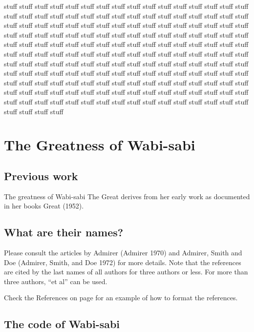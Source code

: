 \documentclass[
  dissertation]{bsu-cs}
\begin{document}
stuff stuff stuff stuff stuff stuff stuff stuff stuff stuff stuff stuff
stuff stuff stuff stuff stuff stuff stuff stuff stuff stuff stuff stuff
stuff stuff stuff stuff stuff stuff stuff stuff stuff stuff stuff stuff
stuff stuff stuff stuff stuff stuff stuff stuff stuff stuff stuff stuff
stuff stuff stuff stuff stuff stuff stuff stuff stuff stuff stuff stuff
stuff stuff stuff stuff stuff stuff stuff stuff stuff stuff stuff stuff
stuff stuff stuff stuff stuff stuff stuff stuff stuff stuff stuff stuff
stuff stuff stuff stuff stuff stuff stuff stuff stuff stuff stuff stuff
stuff stuff stuff stuff stuff stuff stuff stuff stuff stuff stuff stuff
stuff stuff stuff stuff stuff stuff stuff stuff stuff stuff stuff stuff
stuff stuff stuff stuff stuff stuff stuff stuff stuff stuff stuff stuff
stuff stuff stuff stuff stuff stuff stuff stuff stuff stuff stuff stuff
stuff stuff stuff stuff stuff stuff stuff stuff stuff stuff stuff stuff
stuff stuff stuff stuff stuff stuff stuff stuff stuff stuff stuff stuff
stuff stuff stuff stuff stuff stuff stuff stuff stuff stuff stuff stuff

\chapter{The Greatness of Wabi-sabi} \label{ch-wabisabiGreatness}

\section{Previous work}\label{previous-work}

The greatness of Wabi-sabi The Great derives from her early work as
documented in her books Great (1952).

\section{What are their names?}\label{what-are-their-names}

Please consult the articles by Admirer (Admirer 1970) and Admirer, Smith
and Doe (Admirer, Smith, and Doe 1972) for more details. Note that the
references are cited by the last names of all authors for three authors
or less. For more than three authors, ``et al'' can be used.

Check the References on page \pageref{refs} for an example of how to
format the references.

\section{The code of Wabi-sabi}\label{the-code-of-wabi-sabi}
\end{document}

